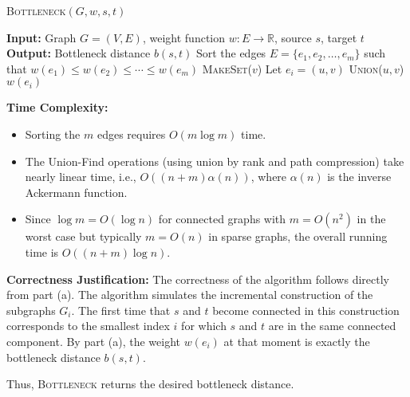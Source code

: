 \documentclass[letterpaper, 11pt]{article}
\newcommand{\1}{\mathds{1}}	%
\theoremstyle{definition}
\newenvironment{solution}{{\par\noindent\it Solution.}}{}
\begin{document}
\begin{solution}
\begin{algorithm}
\caption{\textsc{Bottleneck}$(G,w,s,t)$}
\begin{algorithmic}[1]
\State \textbf{Input:} Graph \( G = (V,E) \), weight function \( w : E \to \mathbb{R} \), source \( s \), target \( t \)
\State \textbf{Output:} Bottleneck distance \( b(s,t) \)
\State
\State Sort the edges \( E = \{e_1,e_2,\dots,e_m\} \) such that \( w(e_1) \le w(e_2) \le \cdots \le w(e_m) \)
    \State \textsc{MakeSet}(\( v \))
\EndFor
{}
    \State Let \( e_i = (u,v) \)
    \State \textsc{Union}(\( u, v \))
        \State \Return \( w(e_i) \)
    \EndIf
\EndFor
\end{algorithmic}
\end{algorithm}

\textbf{Time Complexity:}  
\begin{itemize}
    \item Sorting the \( m \) edges requires \( O(m \log m) \) time.
    \item The Union-Find operations (using union by rank and path compression) take nearly linear time, i.e., \( O((n+m)\alpha(n)) \), where \( \alpha(n) \) is the inverse Ackermann function.
    \item Since \( \log m = O(\log n) \) for connected graphs with \( m = O(n^2) \) in the worst case but typically \( m = O(n) \) in sparse graphs, the overall running time is \( O((n+m)\log n) \).
\end{itemize}

\textbf{Correctness Justification:}  
The correctness of the algorithm follows directly from part (a). The algorithm simulates the incremental construction of the subgraphs \( G_i \). The first time that \( s \) and \( t \) become connected in this construction corresponds to the smallest index \( i \) for which \( s \) and \( t \) are in the same connected component. By part (a), the weight \( w(e_i) \) at that moment is exactly the bottleneck distance \( b(s,t) \).

Thus, \textsc{Bottleneck} returns the desired bottleneck distance.
\end{solution}
\clearpage
\end{document}
